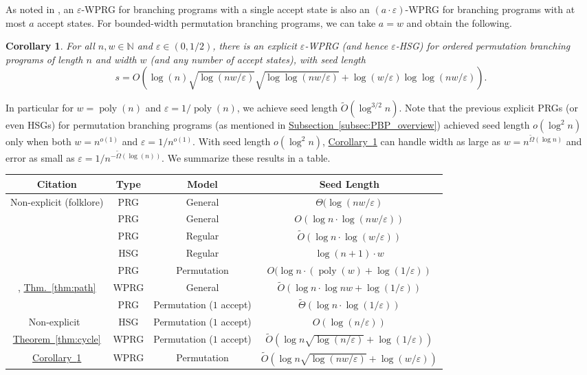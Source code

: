 \documentclass[11pt]{article}
\numberwithin{equation}{section}
\newtheorem{corollary}[theorem]{Corollary}
\theoremstyle{definition}
\theoremstyle{plain}
\newcommand{\N}{\mathbb N}
\newcommand{\expref}[2]{\hyperref[#2]{#1~\ref{#2}}}
\newcommand{\tO}{\widetilde{O}}
\newcommand{\eps}{\varepsilon}
\newcommand{\poly}{\operatorname{poly}}
\begin{document}
As noted in \cite{HozaPyVa21}, an $\eps$-WPRG for branching programs with a single accept state is also an $(a\cdot \eps)$-WPRG for branching programs with at most $a$ accept states.  For bounded-width permutation branching programs, we can take $a=w$ and obtain the following. %
\begin{corollary} \label{cor:permutation-polywidth}
For all $n,w\in \N$ and $\eps \in (0,1/2)$, there is an explicit $\eps$-WPRG (and hence $\eps$-HSG) for ordered permutation branching 
programs of length $n$ and width $w$ (and any number of accept states), with seed length
$$s=O\left(\log(n)\sqrt{\log(nw/\eps)}\sqrt{\log\log(nw/\eps)}+\log(w/\eps)\log\log(nw/\eps)\right).$$
\end{corollary}
In particular for $w=\poly(n)$ and $\eps=1/\poly(n)$, we achieve seed length $\tO(\log^{3/2} n)$.  Note that the previous explicit PRGs (or even HSGs) for permutation branching programs (as mentioned in \expref{Subsection}{subsec:PBP_overview}) achieved seed length $o(\log^2 n)$ only when both $w=n^{o(1)}$ and $\eps=1/n^{o(1)}$.  With seed length $o(\log^2 n)$, 
\expref{Corollary}{cor:permutation-polywidth} can handle width as large as $w=n^{\tilde{\Omega}(\log n)}$ and error as small as $\eps=1/n^{-\tilde{\Omega}(\log(n))}$. 
We summarize these results in a table.\\

%
%
%
\hspace{-0.6cm}
\begin{tabular}{c|c|c|c}    %
     Citation & Type & Model & Seed Length \\\hline
     Non-explicit (folklore) & PRG & General & $\Theta(\log(nw/\eps)$\\
     \cite{Nisan92,ImpagliazzoNiWi94} & PRG & General & $O(\log n \cdot \log(nw/\eps))$\\
     \cite{BravermanRaRaYe10} & PRG & Regular & $\tO(\log n \cdot \log(w/\eps))$\\
     \cite{BravermanRaRaYe10} & HSG & Regular & $\log(n+1)\cdot w$\\
     \cite{KouckyNiPu11,De11,Steinke12} & PRG & Permutation & $O(\log n\cdot (\poly(w)+\log(1/\eps))$\\
     \cite{BravermanCoGa18,ChattopadhyayLi20}, \expref{Thm.}{thm:path} & WPRG & General & $\tO(\log n\cdot \log nw+\log(1/\eps))$\\
%
     \cite{HozaPyVa21} & PRG & Permutation ($1$ accept) & $\widetilde{\Theta}(\log n\cdot \log(1/\eps))$\\
     Non-explicit~\cite{HozaPyVa21} & HSG & Permutation ($1$ accept) & $O(\log (n/\eps))$\\
     \expref{Theorem}{thm:cycle} & WPRG & Permutation ($1$ accept) & $\tO(\log n\sqrt{\log(n/\eps)}+\log(1/\eps))$\\
%
     \expref{Corollary}{cor:permutation-polywidth} & WPRG & Permutation & $\tO(\log n\sqrt{\log(nw/\eps)}+\log(w/\eps))$\\
\end{tabular}
\end{document}

